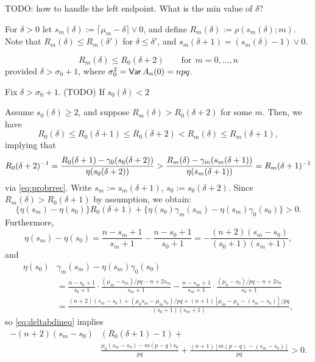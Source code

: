 \documentclass[11pt]{article}
\begin{document}
TODO: how to handle the left endpoint. What is the min value of $\delta$?

For $\delta > 0$ let $s_m(\delta) := \lceil \mu_m - \delta \rceil \vee 0$, and define $R_m(\delta) := \rho(s_m(\delta); m)$.
Note that $R_m(\delta) \leq R_m(\delta')$ for $\delta \leq \delta'$, and
$s_m(\delta + 1) = (s_m(\delta) - 1) \vee 0$.

\begin{prop}
\[ R_m(\delta) \leq R_0(\delta + 2)\qquad\text{for}\ \ m = 0,\dots,n \]
provided $\delta > \sigma_0 + 1$, where
$\sigma_0^2 = \operatorname{\mathsf{Var}} A_n(0) = npq$.
\end{prop}

\begin{pf}
Fix $\delta > \sigma_0 + 1$.
(TODO)
If $s_0(\delta) < 2$

Assume $s_0(\delta) \geq 2$, and suppose $R_m(\delta) > R_0(\delta + 2)$ for
some $m$.
Then, we have
\[ R_0(\delta) \leq R_0(\delta + 1) \leq R_0(\delta + 2) < R_m(\delta) \leq
R_m(\delta + 1),\]
implying that
\[ R_0(\delta + 2)^{-1} =
\frac{R_0(\delta+1) - \gamma_0(s_0(\delta+2))}{\eta(s_0(\delta+2))} > 
\frac{R_m(\delta) - \gamma_m(s_m(\delta+1))}{\eta(s_m(\delta+1))} =
R_m(\delta + 1)^{-1} \]
via \eqref{eq:probrrec}.
Write $s_m := s_m(\delta+1)$, $s_0 := s_0(\delta + 2)$.
Since $R_m(\delta) > R_0(\delta+1)$ by assumption, we obtain:
\begin{equation}\label{eq:deltabdineq}
\big\{\eta(s_m) - \eta(s_0)\big\} R_0(\delta + 1)
 + \big\{\eta(s_0)\gamma_m(s_m) - \eta(s_m)\gamma_0(s_0)\big\} > 0.
\end{equation}
Furthermore,
\[ \eta(s_m) - \eta(s_0)
= \frac{n - s_m + 1}{s_m + 1} - \frac{n - s_0 + 1}{s_0 + 1}
= -\frac{(n + 2)(s_m - s_0)}{(s_0 + 1)(s_m + 1)}, \]
and
\begin{align*}
\eta(s_0)&\gamma_m(s_m) - \eta(s_m)\gamma_0(s_0) \\
&= \frac{n - s_0 + 1}{s_0 + 1}\cdot \frac{(\mu_m - s_m)/pq - n + 2s_m}{s_m + 1} - 
\frac{n - s_m + 1}{s_m + 1}\cdot \frac{(\mu_0-s_0)/ pq - n + 2s_0}{s_0 + 1} \\
 &= \frac{(n+2)(s_m-s_0) + (\mu_0 s_m - \mu_m s_0)/pq +
 (n+1)[\mu_m - \mu_0 - (s_m - s_0)]/pq}{(s_0 + 1)(s_m + 1)},
\end{align*}
so \eqref{eq:deltabdineq} implies
\begin{align}
-(n+2)(s_m - s_0)&(R_0(\delta + 1) - 1) + \nonumber\\
&\frac{\mu_0 (s_m - s_0) - m(p-q) s_0}{pq} +
\frac{(n+1)[m(p-q) - (s_m - s_0)]}{pq} > 0. \label{eq:deltabdineq2}

\end{align}
\end{pf}
\end{document}
